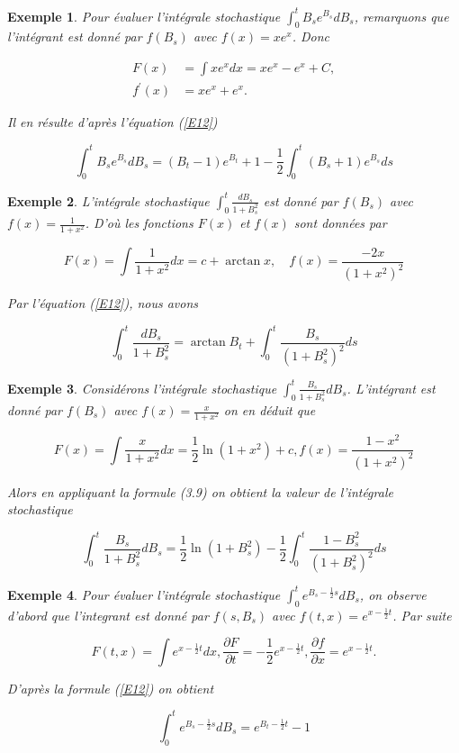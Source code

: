 \documentclass[A4paper,12pt]{report}
\newtheorem{example}{Exemple}[chapter]
\begin{document}
\begin{example} Pour évaluer l'intégrale stochastique $\int_{0}^{t} B_{s} e^{B_{s}} d B_{s}$, remarquons que l'intégrant est donné par $f\left(B_{s}\right)$ avec $f(x)=x e^{x}$. Donc

$$
\begin{aligned}
F(x) & =\int x e^{x} d x=x e^{x}-e^{x}+C, \\
f^{\prime}(x) & =x e^{x}+e^{x} .
\end{aligned}
$$

Il en résulte d'après l'équation (\ref{E12})

$$
\int_{0}^{t} B_{s} e^{B_{s}} d B_{s}=\left(B_{t}-1\right) e^{B_{t}}+1-\frac{1}{2} \int_{0}^{t}\left(B_{s}+1\right) e^{B_{s}} d s
$$
\end{example}
\begin{example} L'intégrale stochastique $\int_{0}^{t} \frac{d B_{s}}{1+B_{s}^{2}}$ est donné par $f\left(B_{s}\right)$ avec $f(x)=\frac{1}{1+x^{2}}$. D'où les fonctions $F(x)$ et $f(x)$ sont données par

$$
F(x)=\int \frac{1}{1+x^{2}} d x=c+\arctan x, \quad f(x)=\frac{-2 x}{\left(1+x^{2}\right)^{2}}
$$

Par l'équation (\ref{E12}), nous avons

$$
\int_{0}^{t} \frac{d B_{s}}{1+B_{s}^{2}}=\arctan B_{t}+\int_{0}^{t} \frac{B_{s}}{\left(1+B_{s}^{2}\right)^{2}} d s
$$
\end{example}
\begin{example} Considérons l'intégrale stochastique $\int_{0}^{t} \frac{B_{s}}{1+B_{s}^{2}} d B_{s}$. L'intégrant est donné par $f\left(B_{s}\right)$ avec $f(x)=\frac{x}{1+x^{2}}$ on en déduit que

$$
F(x)=\int \frac{x}{1+x^{2}} d x=\frac{1}{2} \ln \left(1+x^{2}\right)+c, f(x)=\frac{1-x^{2}}{\left(1+x^{2}\right)^{2}}
$$

Alors en appliquant la formule (3.9) on obtient la valeur de l'intégrale stochastique

$$
\int_{0}^{t} \frac{B_{s}}{1+B_{s}^{2}} d B_{s}=\frac{1}{2} \ln \left(1+B_{s}^{2}\right)-\frac{1}{2} \int_{0}^{t} \frac{1-B_{s}^{2}}{\left(1+B_{s}^{2}\right)^{2}} d s
$$
\end{example}
\begin{example} Pour évaluer l'intégrale stochastique $\int_{0}^{t} e^{B_{s}-\frac{1}{2} s} d B_{s}$, on observe d'abord que l'integrant est donné par $f\left(s, B_{s}\right)$ avec $f(t, x)=e^{x-\frac{1}{2} t}$. Par suite

$$
F(t, x)=\int e^{x-\frac{1}{2} t} d x, \frac{\partial F}{\partial t}=-\frac{1}{2} e^{x-\frac{1}{2} t}, \frac{\partial f}{\partial x}=e^{x-\frac{1}{2} t} .
$$

D'après la formule (\ref{E12}) on obtient

$$
\int_{0}^{t} e^{B_{s}-\frac{1}{2} s} d B_{s}=e^{B_{t}-\frac{1}{2} t}-1
$$
\end{example}
\end{document}
